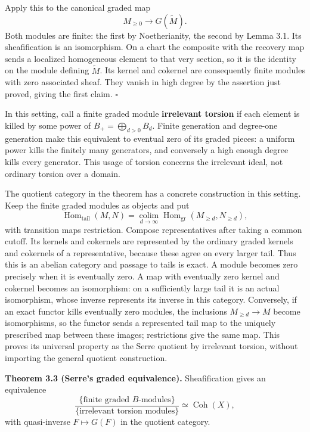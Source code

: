 \documentclass[11pt]{article}
\begin{document}
Apply this to the canonical graded map \[
M_{\ge0}\longrightarrow G(\widetilde M).
\] Both modules are finite: the first by Noetherianity, the second by
Lemma 3.1. Its sheafification is an isomorphism. On a chart the
composite with the recovery map sends a localized homogeneous element to
that very section, so it is the identity on the module defining
\(\widetilde M\). Its kernel and cokernel are consequently finite
modules with zero associated sheaf. They vanish in high degree by the
assertion just proved, giving the first claim. \(\square\)

In this setting, call a finite graded module \textbf{irrelevant torsion}
if each element is killed by some power of \(B_+=\bigoplus_{d>0}B_d\).
Finite generation and degree-one generation make this equivalent to
eventual zero of its graded pieces: a uniform power kills the finitely
many generators, and conversely a high enough degree kills every
generator. This usage of torsion concerns the irrelevant ideal, not
ordinary torsion over a domain.

The quotient category in the theorem has a concrete construction in this
setting. Keep the finite graded modules as objects and put \[
\operatorname{Hom}_{\mathrm{tail}}(M,N)
=\underset{d\to\infty}{\operatorname{colim}}
\operatorname{Hom}_{\mathrm{gr}}(M_{\ge d},N_{\ge d}),
\] with transition maps restriction. Compose representatives after
taking a common cutoff. Its kernels and cokernels are represented by the
ordinary graded kernels and cokernels of a representative, because these
agree on every larger tail. Thus this is an abelian category and passage
to tails is exact. A module becomes zero precisely when it is eventually
zero. A map with eventually zero kernel and cokernel becomes an
isomorphism: on a sufficiently large tail it is an actual isomorphism,
whose inverse represents its inverse in this category. Conversely, if an
exact functor kills eventually zero modules, the inclusions
\(M_{\ge d}\to M\) become isomorphisms, so the functor sends a
represented tail map to the uniquely prescribed map between these
images; restrictions give the same map. This proves its universal
property as the Serre quotient by irrelevant torsion, without importing
the general quotient construction.

\textbf{Theorem 3.3 (Serre's graded equivalence).} Sheafification gives
an equivalence \[
\frac{\{\text{finite graded }B\text{-modules}\}}
{\{\text{irrelevant torsion modules}\}}
\simeq\operatorname{Coh}(X),
\] with quasi-inverse \(F\mapsto G(F)\) in the quotient category.
\end{document}
